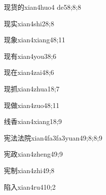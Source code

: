 \begin{verbete}{现货的}{xian4huo4 de5}{8;8;8}
\end{verbete}

\begin{verbete}{现实}{xian4shi2}{8;8}
\end{verbete}

\begin{verbete}{现象}{xian4xiang4}{8;11}
\end{verbete}

\begin{verbete}{现有}{xian4you3}{8;6}
\end{verbete}

\begin{verbete}{现在}{xian4zai4}{8;6}
\end{verbete}

\begin{verbete}{现抓}{xian4zhua1}{8;7}
\end{verbete}

\begin{verbete}{现做}{xian4zuo4}{8;11}
\end{verbete}

\begin{verbete}{线香}{xian4xiang1}{8;9}
\end{verbete}

\begin{verbete}{宪法法院}{xian4fa3fa3yuan4}{9;8;8;9}
\end{verbete}

\begin{verbete}{宪政}{xian4zheng4}{9;9}
\end{verbete}

\begin{verbete}{宪制}{xian4zhi4}{9;8}
\end{verbete}

\begin{verbete}{陷入}{xian4ru4}{10;2}
\end{verbete}

